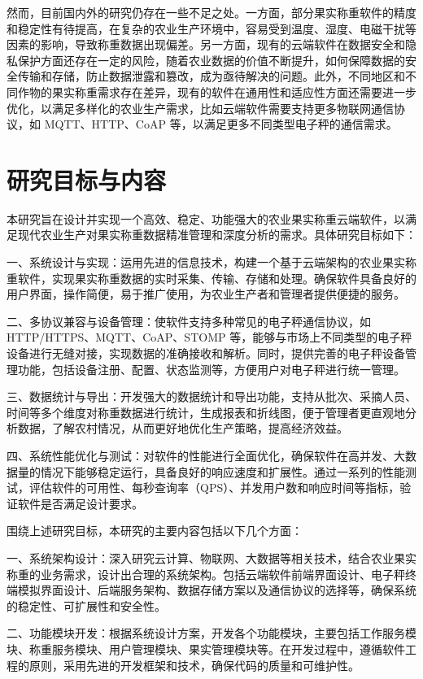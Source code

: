 然而，目前国内外的研究仍存在一些不足之处。一方面，部分果实称重软件的精度和稳定性有待提高，在复杂的农业生产环境中，容易受到温度、湿度、电磁干扰等因素的影响，导致称重数据出现偏差\cite{汤建华2018}。另一方面，现有的云端软件在数据安全和隐私保护方面还存在一定的风险，随着农业数据的价值不断提升，如何保障数据的安全传输和存储，防止数据泄露和篡改，成为亟待解决的问题。此外，不同地区和不同作物的果实称重需求存在差异，现有的软件在通用性和适应性方面还需要进一步优化，以满足多样化的农业生产需求，比如云端软件需要支持更多物联网通信协议，如 MQTT、HTTP、CoAP 等，以满足更多不同类型电子秤的通信需求。

\section{研究目标与内容}

本研究旨在设计并实现一个高效、稳定、功能强大的农业果实称重云端软件，以满足现代农业生产对果实称重数据精准管理和深度分析的需求。具体研究目标如下：

一、系统设计与实现：运用先进的信息技术，构建一个基于云端架构的农业果实称重软件，实现果实称重数据的实时采集、传输、存储和处理。确保软件具备良好的用户界面，操作简便，易于推广使用，为农业生产者和管理者提供便捷的服务。

二、多协议兼容与设备管理：使软件支持多种常见的电子秤通信协议，如 HTTP/HTTPS、MQTT、CoAP、STOMP 等，能够与市场上不同类型的电子秤设备进行无缝对接，实现数据的准确接收和解析。同时，提供完善的电子秤设备管理功能，包括设备注册、配置、状态监测等，方便用户对电子秤进行统一管理。

三、数据统计与导出：开发强大的数据统计和导出功能，支持从批次、采摘人员、时间等多个维度对称重数据进行统计，生成报表和折线图，便于管理者更直观地分析数据，了解农村情况，从而更好地优化生产策略，提高经济效益。

四、系统性能优化与测试：对软件的性能进行全面优化，确保软件在高并发、大数据量的情况下能够稳定运行，具备良好的响应速度和扩展性。通过一系列的性能测试，评估软件的可用性、每秒查询率（QPS）、并发用户数和响应时间等指标，验证软件是否满足设计要求。

围绕上述研究目标，本研究的主要内容包括以下几个方面：

一、系统架构设计：深入研究云计算、物联网、大数据等相关技术，结合农业果实称重的业务需求，设计出合理的系统架构。包括云端软件前端界面设计、电子秤终端模拟界面设计、后端服务架构、数据存储方案以及通信协议的选择等，确保系统的稳定性、可扩展性和安全性。

二、功能模块开发：根据系统设计方案，开发各个功能模块，主要包括工作服务模块、称重服务模块、用户管理模块、果实管理模块等。在开发过程中，遵循软件工程的原则，采用先进的开发框架和技术，确保代码的质量和可维护性。

